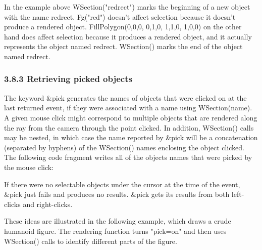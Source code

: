 \documentclass[letterpaper]{article}
\begin{document}
{\bigskip



\bigskip

In the example above
\textsf{WSection("redrect")} marks the
beginning of a new object with the name
redrect. \textsf{Fg("red")} doesn't affect
selection because it doesn't produce a rendered
object. \textsf{FillPolygon(0,0,0, 0,1,0, 1,1,0, 1,0,0)} on the other
hand does affect selection because it produces a rendered object, and
it actually represents the object named redrect.
\textsf{WSection()} marks the end of the object named redrect.


\subsubsection[3.8.3 Retrieving picked objects]{3.8.3 Retrieving picked objects}

The keyword \textsf{\&pick} generates the names of objects that were
clicked on at the last returned event, if they were associated with a
name using \textsf{WSection(name)}. A given mouse click might
correspond to multiple objects that are rendered along the ray from
the camera through the point clicked. In addition, \textsf{WSection()}
calls may be nested, in which case the name reported by
\textsf{\&pick} will be a concatenation (separated by hyphens) of the
\textsf{WSection()} names enclosing the object clicked. The following
code fragment writes all of the objects names that were picked by the
mouse click:


\bigskip



\bigskip

If there were no selectable objects under the cursor at the time of
the event, \textsf{\&pick} just fails and produces no
results. \textsf{\&pick} gets its results from both left-clicks and
right-clicks.

\bigskip

These ideas are illustrated in the following example, which draws
a crude humanoid figure. The rendering function turns
\textsf{"pick=on"} and then uses \textsf{WSection()} calls to
identify different parts of the figure.


}
\end{document}

